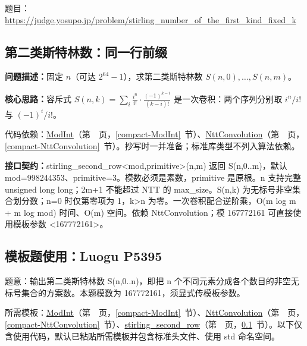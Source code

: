 题目：\url{https://judge.yosupo.jp/problem/stirling_number_of_the_first_kind_fixed_k}



\Needspace{407pt}

\subsection{第二类斯特林数：同一行前缀}\label{compact-stirling_second_row}

\noindent\textbf{问题描述：}\allowbreak 固定 $n$（可达 $2^{64}-1$），求第二类斯特林数 $S(n,0),\dots,S(n,m)$。

\textbf{核心思路：}\allowbreak 容斥式 $S(n,k)=\sum_i\frac{i^n}{i!}\cdot\frac{(-1)^{k-i}}{(k-i)!}$ 是一次卷积：两个序列分别取 $i^n/i!$ 与 $(-1)^i/i!$。

代码依赖：\hyperref[compact-ModInt]{ModInt}（第~\pageref{compact-ModInt}~页，\ref{compact-ModInt}~节）、\hyperref[compact-NttConvolution]{NttConvolution}（第~\pageref{compact-NttConvolution}~页，\ref{compact-NttConvolution}~节）。抄写时一并准备；标准库类型不列入算法依赖。

{\sloppy{}\noindent\textbf{接口契约：}stirling\_second\_row<mod,primitive>(n,m) 返回 S(n,0..m)，默认 mod=998244353、primitive=3。模数必须是素数，primitive 是原根。n 支持完整 unsigned long long；2m+1 不能超过 NTT 的 max\_size。S(n,k) 为无标号非空集合划分数；n=0 时仅第零项为 1，k>n 为零。一次卷积配合逆阶乘，O(m log m + m log mod) 时间、O(m) 空间。依赖 NttConvolution；模 167772161 可直接使用模板参数 <167772161>。\par}



\Needspace{242pt}

\subsection*{模板题使用：Luogu P5395}

\label{usage-example-53}

题意：输出第二类斯特林数 S(n,0..n)，即把 n 个不同元素分成各个数目的非空无标号集合的方案数。本题模数为 167772161，须显式传模板参数。

所需模板：\hyperref[compact-ModInt]{ModInt}（第~\pageref{compact-ModInt}~页，\ref{compact-ModInt}~节）、\hyperref[compact-NttConvolution]{NttConvolution}（第~\pageref{compact-NttConvolution}~页，\ref{compact-NttConvolution}~节）、\hyperref[compact-stirling_second_row]{stirling\_\allowbreak{}second\_\allowbreak{}row}（第~\pageref{compact-stirling_second_row}~页，\ref{compact-stirling_second_row}~节）。以下仅含使用代码，默认已粘贴所需模板并包含标准头文件、使用 std 命名空间。

